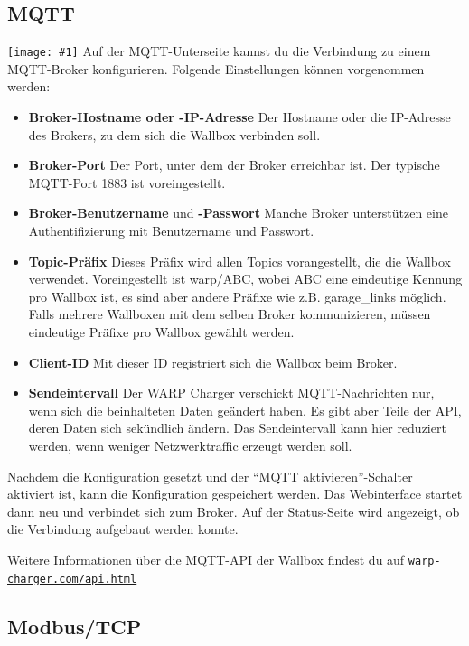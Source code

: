 \documentclass[a4paper,10pt]{article}
\newcommand{\gfx}[1]{\texttt{[image: \#1]}}
\newcommand\rurl[2]{%
  \href{#1}{\nolinkurl{#2}}%
}
\begin{document}
\begin{multicols*}{2}
    \subsection{MQTT}\label{mqtt-interface}

    \gfx{./img_warp2/resized/web_mqtt}
    Auf der MQTT-Unterseite kannst du die Verbindung zu einem MQTT-Broker konfigurieren. Folgende Einstellungen können vorgenommen werden:
    \begin{itemize}
        \item \textbf{Broker-Hostname oder -IP-Adresse} Der Host\-name oder die IP-Adresse des Brokers, zu dem sich die Wallbox verbinden soll.
        \item \textbf{Broker-Port} Der Port, unter dem der Broker erreichbar ist. Der typische MQTT-Port 1883 ist voreingestellt.
        \item \textbf{Broker-Benutzername} und \textbf{-Passwort} Manche Broker unterstützen eine Authentifizierung mit Benutzername und Passwort.
        \item \textbf{Topic-Präfix} Dieses Präfix wird allen Topics vorangestellt, die die Wallbox verwendet.
              Voreingestellt ist warp/ABC, wobei ABC eine eindeutige Kennung pro Wallbox ist,
              es sind aber andere Präfixe wie z.B. garage\_links möglich.
              Falls mehrere Wallboxen mit dem selben Broker kommunizieren,
              müssen eindeutige Präfixe pro Wallbox gewählt werden.
        \item \textbf{Client-ID} Mit dieser ID registriert sich die Wallbox beim Broker.
        \item \textbf{Sendeintervall} Der WARP Charger verschickt MQTT-Nachrichten nur, wenn sich die beinhalteten Daten geändert haben.
            Es gibt aber Teile der API, deren Daten sich sekündlich ändern. Das Sendeintervall kann hier reduziert werden, wenn weniger Netzwerktraffic
            erzeugt werden soll.
    \end{itemize}
    Nachdem die Konfiguration gesetzt und der \enquote{MQTT aktivieren}-Schalter aktiviert ist, kann die Konfiguration gespeichert werden.
    Das Webinterface startet dann neu und verbindet sich zum Broker.
    Auf der Status-Seite wird angezeigt, ob die Verbindung aufgebaut werden konnte.

    Weitere Informationen über die MQTT-API der Wallbox findest du auf \rurl{https://warp-charger.com/api.html}{warp-charger.com/api.html}

    \subsection{Modbus/TCP}


\end{multicols*}
\end{document}
